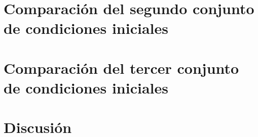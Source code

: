 \section{Comparación del segundo conjunto de condiciones iniciales}
\section{Comparación del tercer conjunto de condiciones iniciales}

\section{Discusión}
%
